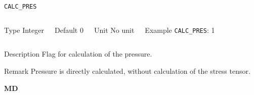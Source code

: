 \documentclass[xcolor=dvipsnames,t]{beamer}
\begin{document}
\begin{frame}[allowframebreaks]{\texttt{CALC\_PRES}} \label{CALC_PRES}
\vspace*{-12pt}
\begin{columns}
\begin{block}{Type}
Integer
\end{block}

\begin{block}{Default}
0
\end{block}

\begin{block}{Unit}
No unit
\end{block}

\begin{block}{Example}
\texttt{CALC\_PRES}: 1
\end{block}
\end{columns}

\begin{block}{Description}
Flag for calculation of the pressure.
\end{block}

\begin{block}{Remark}
Pressure is directly calculated, without calculation of the stress tensor.
\end{block}

\end{frame}



\begin{frame}[allowframebreaks,c]{} \label{MD}

\begin{center}
\Huge \textbf{MD}
\end{center}

\end{frame}
\end{document}
